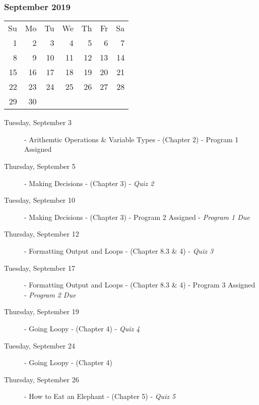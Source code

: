 \subsubsection*{September 2019}
\begin{tabular}{rrrrrrr}
Su & Mo & Tu & We & Th & Fr & Sa\\
 1 &  2 &  3 &  4 &  5 &  6 & 7\\
 8 &  9 & 10 & 11 & 12 & 13 & 14\\
15 & 16 & 17 & 18 & 19 & 20 & 21\\
22 & 23 & 24 & 25 & 26 & 27 & 28\\
29 & 30 &    &    &    &    &   \\
\end{tabular}
\begin{description}
\item[Tuesday, September 3]
  - Arithemtic Operations \& Variable Types
  \newline- (Chapter 2)
  \newline- Program 1 Assigned
\item[Thursday, September 5]
  - Making Decisions
  \newline- (Chapter 3)
  \newline- {\em Quiz 2}

\item[Tuesday, September 10]
  - Making Decisions
  \newline- (Chapter 3)
  \newline- Program 2 Assigned
  \newline- {\em Program 1 Due}
\item[Thursday, September 12]
  - Formatting Output and Loops
  \newline- (Chapter 8.3 \& 4)
  \newline- {\em Quiz 3}

\item[Tuesday, September 17]
  - Formatting Output and Loops
  \newline- (Chapter 8.3 \& 4)
  \newline- Program 3 Assigned
  \newline- {\em Program 2 Due}
\item[Thursday, September 19]
  - Going Loopy
  \newline- (Chapter 4)
  \newline- {\em Quiz 4}

\item[Tuesday, September 24]
  - Going Loopy
  \newline- (Chapter 4)
\item[Thursday, September 26]
  - How to Eat an Elephant
  \newline- (Chapter 5)
  \newline- {\em Quiz 5}
\end{description}


